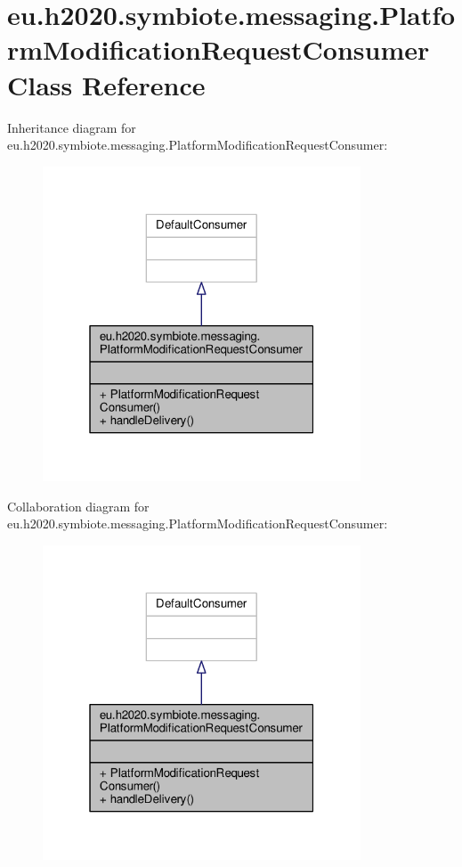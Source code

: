 \hypertarget{classeu_1_1h2020_1_1symbiote_1_1messaging_1_1PlatformModificationRequestConsumer}{}\section{eu.\+h2020.\+symbiote.\+messaging.\+Platform\+Modification\+Request\+Consumer Class Reference}
\label{classeu_1_1h2020_1_1symbiote_1_1messaging_1_1PlatformModificationRequestConsumer}


Inheritance diagram for eu.\+h2020.\+symbiote.\+messaging.\+Platform\+Modification\+Request\+Consumer\+:
\nopagebreak
\begin{figure}[H]
\begin{center}
\leavevmode
\includegraphics[width=268pt]{classeu_1_1h2020_1_1symbiote_1_1messaging_1_1PlatformModificationRequestConsumer__inherit__graph}
\end{center}
\end{figure}


Collaboration diagram for eu.\+h2020.\+symbiote.\+messaging.\+Platform\+Modification\+Request\+Consumer\+:
\nopagebreak
\begin{figure}[H]
\begin{center}
\leavevmode
\includegraphics[width=268pt]{classeu_1_1h2020_1_1symbiote_1_1messaging_1_1PlatformModificationRequestConsumer__coll__graph}
\end{center}
\end{figure}
